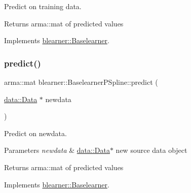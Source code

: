 Predict on training data. 

\begin{DoxyReturn}{Returns}
{\ttfamily arma\+::mat} of predicted values 
\end{DoxyReturn}


Implements \hyperlink{classblearner_1_1_baselearner_ab37986047db43c84420fef2cef7fc20d}{blearner\+::\+Baselearner}.

\mbox{\label{classblearner_1_1_baselearner_p_spline_a241485cc3e932c45564370a0881e3772}} 
\subsubsection{\texorpdfstring{predict()}{predict()}\hspace{0.1cm}{\footnotesize\ttfamily [2/2]}}
{\footnotesize\ttfamily arma\+::mat blearner\+::\+Baselearner\+P\+Spline\+::predict (\begin{DoxyParamCaption}\item[{\hyperlink{classdata_1_1_data}{data\+::\+Data} $\ast$}]{newdata }\end{DoxyParamCaption})\hspace{0.3cm}{\ttfamily [virtual]}}



Predict on newdata. 


\begin{DoxyParams}{Parameters}
{\em newdata} & {\ttfamily \hyperlink{classdata_1_1_data}{data\+::\+Data}$\ast$} new source data object\\
\hline
\end{DoxyParams}
\begin{DoxyReturn}{Returns}
{\ttfamily arma\+::mat} of predicted values 
\end{DoxyReturn}


Implements \hyperlink{classblearner_1_1_baselearner_ae2ef5e018783578e02b3b5a33fa94eae}{blearner\+::\+Baselearner}.

